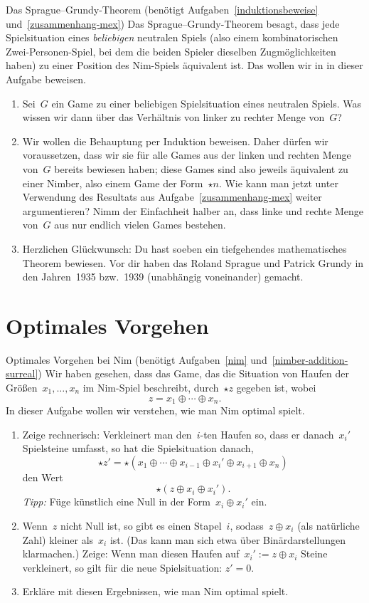 \documentclass{zirkelblatt}
\newcommand{\head}[1]{\section*{\rmfamily #1}}%
\begin{document}
\begin{aufgabe}{Das Sprague--Grundy-Theorem
(benötigt Aufgaben~\ref{induktionsbeweise} und~\ref{zusammenhang-mex})}
\label{sprague-grundy}
Das Sprague--Grundy-Theorem besagt, dass jede Spielsituation eines
\emph{beliebigen} neutralen Spiels (also einem
kombinatorischen Zwei-Personen-Spiel, bei dem die beiden Spieler dieselben
Zugmöglichkeiten haben) zu einer Position des Nim-Spiels äquivalent ist. Das
wollen wir in in dieser Aufgabe beweisen.
\begin{enumerate}
\item Sei~$G$ ein Game zu einer beliebigen Spielsituation eines neutralen
Spiels. Was wissen wir dann über das Verhältnis von linker zu rechter Menge
von~$G$?
\item Wir wollen die Behauptung per Induktion beweisen. Daher dürfen wir
voraussetzen, dass wir sie für alle Games aus der linken und rechten Menge
von~$G$ bereits bewiesen haben; diese Games sind also jeweils äquivalent zu
einer Nimber, also einem Game der Form~$\star n$. Wie kann man jetzt unter
Verwendung des Resultats aus Aufgabe~\ref{zusammenhang-mex} weiter argumentieren?
Nimm der Einfachheit halber an, dass linke und rechte Menge von~$G$ aus nur
endlich vielen Games bestehen.
\item Herzlichen Glückwunsch: Du hast soeben ein tiefgehendes mathematisches
Theorem bewiesen. Vor dir haben das Roland Sprague und Patrick Grundy in den
Jahren~1935 bzw.~1939 (unabhängig voneinander) gemacht.
\end{enumerate}
\end{aufgabe}


\head{Optimales Vorgehen}

\begin{aufgabe}{Optimales Vorgehen bei Nim
(benötigt Aufgaben~\ref{nim} und~\ref{nimber-addition-surreal})}
\label{nim-optimal}
Wir haben gesehen, dass das Game, das die Situation von Haufen der
Größen~$x_1,\ldots,x_n$ im Nim-Spiel beschreibt, durch~$\star z$ gegeben ist,
wobei
\[ z = x_1 \oplus \cdots \oplus x_n. \]
In dieser Aufgabe wollen wir verstehen, wie man Nim optimal
spielt.
\begin{enumerate}
\item Zeige rechnerisch: Verkleinert man den~$i$-ten Haufen so, dass er
danach~$x_i'$ Spielsteine umfasst, so hat die Spielsituation danach,
\[ \star z' = \star(x_1 \oplus \cdots \oplus x_{i-1} \oplus x_i' \oplus x_{i+1} \oplus
x_n) \]
den Wert
\[ \star(z \oplus x_i \oplus x_i'). \]
\emph{Tipp:} Füge künstlich eine Null in der Form~$x_i \oplus x_i'$ ein.
\item Wenn~$z$ nicht Null ist, so gibt es einen Stapel~$i$, sodass~$z \oplus
x_i$ (als natürliche Zahl) kleiner als~$x_i$ ist. (Das kann man sich etwa über
Binärdarstellungen klarmachen.) Zeige: Wenn man diesen Haufen auf~$x_i' :=
z \oplus x_i$ Steine verkleinert, so gilt für die neue Spielsituation: $z' =
0$.
\item Erkläre mit diesen Ergebnissen, wie man Nim optimal spielt.
\end{enumerate}
\end{aufgabe}
\end{document}
